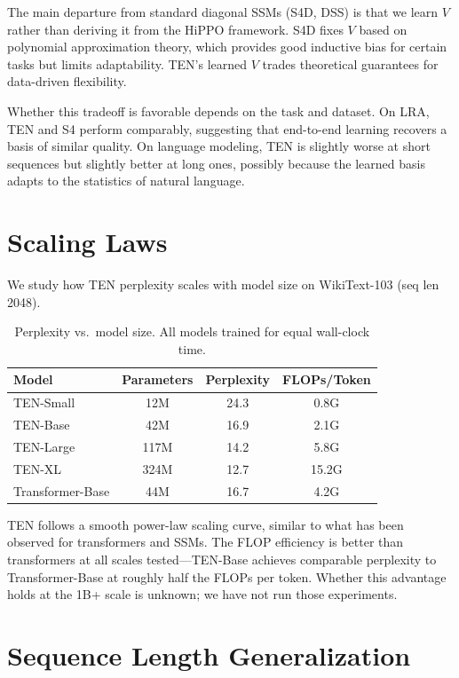 \documentclass{article}
\begin{document}
The main departure from standard diagonal SSMs (S4D, DSS) is that we learn $V$ rather than deriving it from the HiPPO framework. S4D fixes $V$ based on polynomial approximation theory, which provides good inductive bias for certain tasks but limits adaptability. TEN's learned $V$ trades theoretical guarantees for data-driven flexibility.

Whether this tradeoff is favorable depends on the task and dataset. On LRA, TEN and S4 perform comparably, suggesting that end-to-end learning recovers a basis of similar quality. On language modeling, TEN is slightly worse at short sequences but slightly better at long ones, possibly because the learned basis adapts to the statistics of natural language.


\section{Scaling Laws}
\label{app:scaling}

We study how TEN perplexity scales with model size on WikiText-103 (seq len 2048).

\begin{table}[h]
\centering
\caption{Perplexity vs.\ model size. All models trained for equal wall-clock time.}
\label{tab:scaling}
\begin{tabular}{lccc}
\toprule
Model & Parameters & Perplexity & FLOPs/Token \\
\midrule
TEN-Small & 12M & 24.3 & 0.8G \\
TEN-Base & 42M & 16.9 & 2.1G \\
TEN-Large & 117M & 14.2 & 5.8G \\
TEN-XL & 324M & 12.7 & 15.2G \\
\midrule
Transformer-Base & 44M & 16.7 & 4.2G \\
\bottomrule
\end{tabular}
\end{table}

TEN follows a smooth power-law scaling curve, similar to what has been observed for transformers and SSMs. The FLOP efficiency is better than transformers at all scales tested---TEN-Base achieves comparable perplexity to Transformer-Base at roughly half the FLOPs per token. Whether this advantage holds at the 1B+ scale is unknown; we have not run those experiments.


\section{Sequence Length Generalization}
\label{app:ood}
\end{document}
